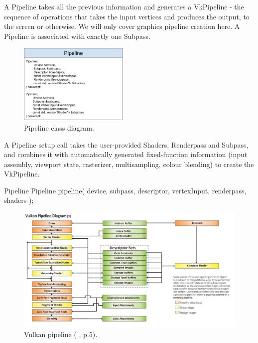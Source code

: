 \documentclass[12pt]{report}
\newcommand{\citediagram}[2]{(\citeauthor{#1} \citeyear{#1}, p.#2)}
\newcommand{\imagewidth}{0.47\textwidth}
\theoremstyle{definition}
\begin{document}
        A Pipeline takes all the previous information and generates a
        VkPipeline - the sequence of operations that takes the input vertices
        and produces the output, to the screen or otherwise. We will only
        cover graphics pipeline creation here. A Pipeline is associated with
        exactly one Subpass.
        
        \begin{figure}[h]
          \centering
          \includegraphics[width=\imagewidth]{images/class_pipeline.png}
          \caption{Pipeline class diagram.}
          \label{fig:class_pipeline}
        \end{figure}

        A Pipeline setup call takes the user-provided Shaders, Renderpass and
        Subpass, and combines it with automatically generated
        fixed-function information (input assembly, viewport state,
        rasterizer, multisampling, colour blending) to create the VkPipeline.

        \begin{usage}{Pipeline}
  Pipeline pipeline(
    device, subpass, descriptor, vertexInput,
    renderpass, shaders
  );
        \end{usage}

        \begin{figure}[h]
          \centering
          \includegraphics[width=\textwidth]{images/vulkan_pipeline.png}
          \caption{Vulkan pipeline \citediagram{reference_guide}{5}.}
          \label{fig:vulkan_pipeline}
        \end{figure}
\end{document}
